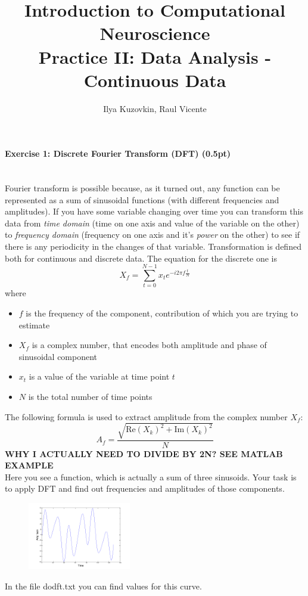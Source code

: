 \documentclass[a4paper,11pt]{article}
\author{\large{Ilya Kuzovkin, Raul Vicente}}
\title{\huge{Introduction to Computational Neuroscience}\\\LARGE{Practice II: Data Analysis - Continuous Data}}
\newenvironment{exercise}[3]{\paragraph{Exercise #1: #2 (#3pt)}\ \\}{
\medskip}
\begin{document}
\maketitle

\begin{exercise}{1}{Discrete Fourier Transform (DFT)}{0.5}
Fourier transform is possible because, as it turned out, any function can be represented as a sum of sinusoidal functions (with different frequencies and amplitudes). If you have some variable changing over time you can transform this data from \emph{time domain} (time on one axis and value of the variable on the other) to \emph{frequency domain} (frequency on one axis and it's \emph{power} on the other) to see if there is any periodicity in the changes of that variable.
Transformation is defined both for continuous and discrete data. The equation for the discrete one is
$$X_f = \displaystyle\sum_{t=0}^{N-1}x_t e^{-i2\pi f\frac{t}{N}}$$
where
\begin{itemize}
\itemsep 0em
	\item $f$ is the frequency of the component, contribution of which you are trying to estimate
	\item $X_f$ is a complex number, that encodes both amplitude and phase of sinusoidal component
	\item $x_t$ is a value of the variable at time point $t$
	\item $N$ is the total number of time points
\end{itemize}
The following formula is used to extract amplitude from the complex number $X_f$:
$$A_f = \frac{\sqrt{\text{Re}(X_k)^2 + \text{Im}(X_k)^2}}{N}$$
\textbf{WHY I ACTUALLY NEED TO DIVIDE BY 2N? SEE MATLAB EXAMPLE}\\
Here you see a function, which is actually a sum of three sinusoids. Your task is to apply DFT and find out frequencies and amplitudes of those components.
\begin{figure}[htbp]
   \centering
   \includegraphics[width=0.4\textwidth]{dodft.png} 
\end{figure}
In the file dodft.txt you can find values for this curve.
\end{exercise}
\end{document}
